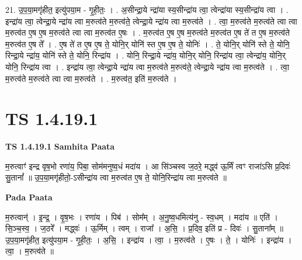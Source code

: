 \documentclass[17pt]{extarticle}
\begin{document}
21. उ॒प॒या॒मगृ॑हीत॒ इत्यु॑पया॒म - गृ॒ही॒तः॒ । . अ॒सीन्द्रा॒ये न्द्रा॑या स्य॒सीन्द्रा॑य त्वा॒ त्वेन्द्रा॑या स्य॒सीन्द्रा॑य त्वा । . इन्द्रा॑य त्वा॒ त्वेन्द्रा॒ये न्द्रा॑य त्वा म॒रुत्व॑ते म॒रुत्व॑ते॒ त्वेन्द्रा॒ये न्द्रा॑य त्वा म॒रुत्व॑ते । . त्वा॒ म॒रुत्व॑ते म॒रुत्व॑ते त्वा त्वा म॒रुत्व॑त ए॒ष ए॒ष म॒रुत्व॑ते त्वा त्वा म॒रुत्व॑त ए॒षः । . म॒रुत्व॑त ए॒ष ए॒ष म॒रुत्व॑ते म॒रुत्व॑त ए॒ष ते॑ त ए॒ष म॒रुत्व॑ते म॒रुत्व॑त ए॒ष ते᳚ । . ए॒ष ते॑ त ए॒ष ए॒ष ते॒ योनि॒र् योनि॑ स्त ए॒ष ए॒ष ते॒ योनिः॑ । . ते॒ योनि॒र् योनि॑ स्ते ते॒ योनि॒ रिन्द्रा॒ये न्द्रा॑य॒ योनि॑ स्ते ते॒ योनि॒ रिन्द्रा॑य । . योनि॒ रिन्द्रा॒ये न्द्रा॑य॒ योनि॒र् योनि॒ रिन्द्रा॑य त्वा॒ त्वेन्द्रा॑य॒ योनि॒र् योनि॒ रिन्द्रा॑य त्वा । . इन्द्रा॑य त्वा॒ त्वेन्द्रा॒ये न्द्रा॑य त्वा म॒रुत्व॑ते म॒रुत्व॑ते॒ त्वेन्द्रा॒ये न्द्रा॑य त्वा म॒रुत्व॑ते । . त्वा॒ म॒रुत्व॑ते म॒रुत्व॑ते त्वा त्वा म॒रुत्व॑ते । . म॒रुत्व॑त॒ इति॑ म॒रुत्व॑ते । \newline
\pagebreak
{}
\section*{ TS 1.4.19.1 }

\textbf{TS 1.4.19.1 } \newline
\textbf{Samhita Paata} \newline

म॒रुत्वाꣳ॑ इन्द्र वृष॒भो रणा॑य॒ पिबा॒ सोम॑मनुष्व॒धं मदा॑य । आ सि॑ञ्चस्व ज॒ठरे॒ मद्ध्व॑ ऊ॒र्मिं त्वꣳ राजा॑ऽसि प्र॒दिवः॑ सु॒तानां᳚ ॥ उ॒प॒या॒मगृ॑हीतो॒-ऽसीन्द्रा॑य त्वा म॒रुत्व॑त ए॒ष ते॒ योनि॒रिन्द्रा॑य त्वा म॒रुत्व॑ते ॥ \newline

\textbf{Pada Paata} \newline

म॒रुत्वान्॑ । इ॒न्द्र॒ । वृ॒ष॒भः । रणा॑य । पिब॑ । सोम᳚म् । अ॒नु॒ष्व॒धमित्य॑नु - स्व॒धम् । मदा॑य ॥ एति॑ । सि॒ञ्च॒स्व॒ । ज॒ठरे᳚ । मद्ध्वः॑ । ऊ॒र्मिम् । त्वम् । राजा᳚ । अ॒सि॒ । प्र॒दिव॒ इति॑ प्र - दिवः॑ । सु॒ताना᳚म् ॥ उ॒प॒या॒मगृ॑हीत॒ इत्यु॑पया॒म - गृ॒ही॒तः॒ । अ॒सि॒ । इन्द्रा॑य । त्वा॒ । म॒रुत्व॑ते । ए॒षः । ते॒ । योनिः॑ । इन्द्रा॑य । त्वा॒ । म॒रुत्व॑ते ॥  \newline
\end{document}
